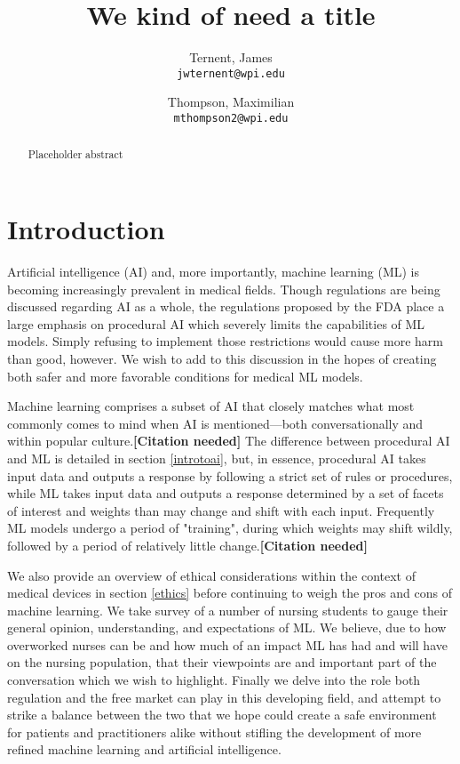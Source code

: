 \documentclass[]{article}
\title{We kind of need a title}
\author{
  Ternent, James\\
  \texttt{jwternent@wpi.edu}
  \and
  Thompson, Maximilian\\
  \texttt{mthompson2@wpi.edu}
}
\begin{document}
	
	\maketitle
	
	\begin{abstract}
		Placeholder abstract
	\end{abstract}
	
	\section{Introduction}
	
		Artificial intelligence (AI) and, more importantly, machine learning (ML) is becoming increasingly prevalent in medical fields. Though regulations are being discussed regarding AI as a whole, the regulations proposed by the FDA\cite{fdaregproposal} place a large emphasis on procedural AI which severely limits the capabilities of ML models. Simply refusing to implement those restrictions would cause more harm than good, however. We wish to add to this discussion in the hopes of creating both safer and more favorable conditions for medical ML models.

		Machine learning comprises a subset of AI that closely matches what most commonly comes to mind when AI is mentioned---both conversationally and within popular culture.\textbf{[Citation needed]} The difference between procedural AI and ML is detailed in section \ref{introtoai}, but, in essence, procedural AI takes input data and outputs a response by following a strict set of rules or procedures, while ML takes input data and outputs a response determined by a set of facets of interest and weights than may change and shift with each input. Frequently ML models undergo a period of "training", during which weights may shift wildly, followed by a period of relatively little change.\textbf{[Citation needed]}

		We also provide an overview of ethical considerations within the context of medical devices in section \ref{ethics} before continuing to weigh the pros and cons of machine learning. We take survey of a number of nursing students to gauge their general opinion, understanding, and expectations of ML. We believe, due to how overworked nurses can be\cite{doi:10.1111/j.1365-2648.2009.05082.x} and how much of an impact ML has had and will have on the nursing population\cite{Ham2017}, that their viewpoints are and important part of the conversation which we wish to highlight. Finally we delve into the role both regulation and the free market can play in this developing field, and attempt to strike a balance between the two that we hope could create a safe environment for patients and practitioners alike without stifling the development of more refined machine learning and artificial intelligence.
\end{document}
